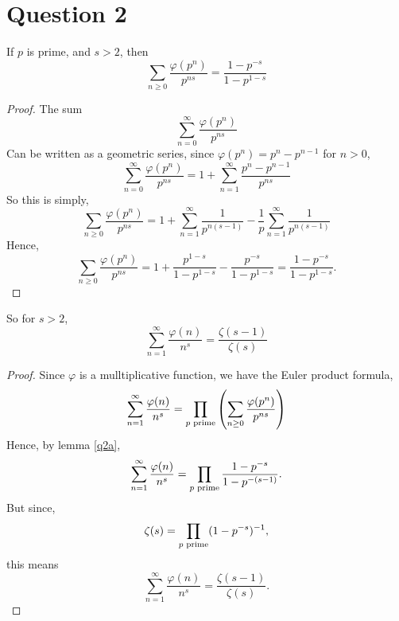 \documentclass{unswmaths}
\begin{document}
    \section*{Question 2}
    \begin{lemma}
    \label{q2a}
        If $p$ is prime, and $s > 2$, then
        \begin{equation*}
            \sum_{n\geq 0} \frac{\varphi(p^n)}{p^{ns}} = \frac{1-p^{-s}}{1-p^{1-s}}
        \end{equation*}
    \end{lemma}
    \begin{proof}
        The sum
        \begin{equation*}
            \sum_{n=0}^\infty \frac{\varphi(p^n)}{p^{ns}}
        \end{equation*}
        Can be written as a geometric series, since $\varphi(p^n) = p^n-p^{n-1}$ for $n > 0$,
        \begin{equation*}
            \sum_{n=0}^\infty \frac{\varphi(p^n)}{p^{ns}} = 1+\sum_{n=1}^\infty \frac{p^n-p^{n-1}}{p^{ns}}
        \end{equation*}
        So this is simply,
        \begin{equation*}
            \sum_{n\geq 0} \frac{\varphi(p^n)}{p^{ns}} = 1+\sum_{n=1}^\infty \frac{1}{p^{n(s-1)}} - \frac{1}{p}\sum_{n=1}^\infty \frac{1}{p^{n(s-1)}}
        \end{equation*}
        Hence,
        \begin{equation*}
            \sum_{n\geq 0} \frac{\varphi(p^n)}{p^{{ns}}} = 1+\frac{p^{1-s}}{1-p^{1-s}}-\frac{p^{-s}}{1-p^{1-s}} = \frac{1-p^{-s}}{1-p^{1-s}}.
        \end{equation*}
    \end{proof}
    \begin{theorem}
    So for $s > 2$, 
        \begin{equation*}
            \sum_{n = 1}^\infty \frac{\varphi(n)}{n^s}  = \frac{\zeta(s-1)}{\zeta(s)}
       \end{equation*}
    \end{theorem}
    \begin{proof}
        Since $\varphi$ is a mulltiplicative function, we have the Euler product formula,
        \begin{equation*}
            \sum_{n=1}^\infty \frac{\varphi(n)}{n^s} = \prod_{{p\text{ prime}}} \left(\sum_{n\geq 0}\frac{\varphi(p^n)}{p^{ns}}\right)
        \end{equation*}
        Hence, by lemma \ref{q2a},
        \begin{equation*}
            \sum_{n=1}^\infty \frac{\varphi(n)}{n^s} = \prod_{{p\text{ prime}}} \frac{1-p^{-s}}{1-p^{-(s-1)}}.
        \end{equation*}
        But since,
        \begin{equation*}
            \zeta(s) = \prod_{{p\text{ prime}}} (1-p^{-s})^{-1},
        \end{equation*}
        this means
        \begin{equation*}
            \sum_{n=1}^\infty \frac{\varphi(n)}{n^s} = \frac{\zeta(s-1)}{\zeta(s)}.
        \end{equation*}
    \end{proof}
    
\end{document}
